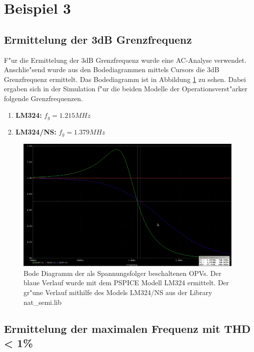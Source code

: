 \section{Beispiel 3}

\subsection{Ermittelung der 3dB Grenzfrequenz}

F"ur die Ermittelung der 3dB Grenzfrequenz wurde eine AC-Analyse verwendet.
Anschlie"send wurde aus den Bodediagrammen mittels Cursors die 3dB Grenzfrequenz ermittelt.
Das Bodediagramm ist in Abbildung \ref{fig:bode} zu sehen.
Dabei ergaben sich in der Simulation f"ur die beiden Modelle der Operationsverst"arker folgende Grenzfrequenzen.
\begin{enumerate}
 \item \textbf{LM324:} $f_g = 1.215 MHz$
 \item \textbf{LM324/NS:} $f_g = 1.379 MHz$
\end{enumerate}


\begin{figure}[h!]
 \centering
 \includegraphics[width=16cm,keepaspectratio=true]{./fig/3_bode.png}
 \caption{Bode Diagramm der als Spannungsfolger beschaltenen OPVs. Der blaue Verlauf
 wurde mit dem PSPICE Modell LM324 ermittelt. Der gr"une Verlauf mithilfe des Models
 LM324/NS aus der Library nat\_semi.lib}
 \label{fig:bode}
\end{figure}

\subsection{Ermittelung der maximalen Frequenz mit THD < 1\%}

